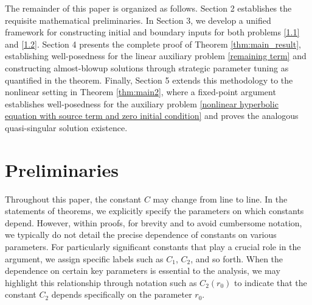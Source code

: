 \documentclass[11pt,reqno,oneside]{amsart}
\numberwithin{equation}{section}
\theoremstyle{definition}
\theoremstyle{remark}
\numberwithin{equation}{section}
\begin{document}
	
	The remainder of this paper is organized as follows. Section 2 establishes the requisite mathematical preliminaries. In Section 3, we develop a unified framework for constructing initial and boundary inputs for both problems \eqref{1.1} and \eqref{1.2}. Section 4 presents the complete proof of Theorem \ref{thm:main_result}, establishing well-posedness for the linear auxiliary problem \eqref{remaining term} and constructing almost-blowup solutions through strategic parameter tuning as quantified in the theorem. Finally, Section 5 extends this methodology to the nonlinear setting in Theorem \ref{thm:main2}, where a fixed-point argument establishes well-posedness for the auxiliary problem \eqref{nonlinear hyperbolic equation with source term and zero initial condition} and proves the analogous quasi-singular solution existence.
	
	
	
	
	
	\section{Preliminaries}
	
	Throughout this paper, the constant $C$ may change from line to line. In the statements of theorems, we explicitly specify the parameters on which constants depend. However, within proofs, for brevity and to avoid cumbersome notation, we typically do not detail the precise dependence of constants on various parameters. For particularly significant constants that play a crucial role in the argument, we assign specific labels such as $C_1$, $C_2$, and so forth. When the dependence on certain key parameters is essential to the analysis, we may highlight this relationship through notation such as $C_2(r_0)$ to indicate that the constant $C_2$ depends specifically on the parameter $r_0$.
	
\end{document}
